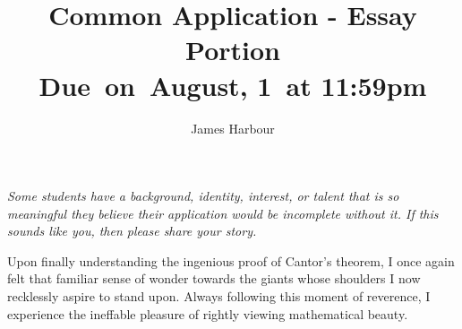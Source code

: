 \documentclass[12pt]{article}
\title{
    \vspace{2in}
    \textmd{\textbf{Common Application - Essay Portion}}\\
    \normalsize\vspace{0.1in}\small{Due\ on\  August, 1\ at 11:59pm}\\
    \vspace{3in}
}
\author{James Harbour}
\begin{document}
\maketitle
\pagebreak
 \begin{center}

   \emph{Some students have a background, identity, interest, or talent that is so meaningful they believe their application would be incomplete without it. If this sounds like you, then please share your story.}

 \end{center}
\raggedright\setlength{\parindent}{0.5in}

Upon finally understanding the ingenious proof of Cantor’s theorem, I once again felt that familiar sense of wonder towards the giants whose shoulders I now recklessly aspire to stand upon. Always following this moment of reverence, I experience the ineffable pleasure of rightly viewing mathematical beauty.
\end{document}
